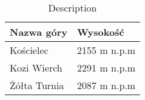 \begin{table}[htbp]
    \centering
    \begin{tabular}{ | m{2.5cm} | m{2.5cm} | }
        \hline
        \textbf{Nazwa góry} & \textbf{Wysokość} \\
        \hline
        Kościelec & 2155 m n.p.m \\
        \hline
        Kozi Wierch & 2291 m n.p.m \\
        \hline
        Żółta Turnia & 2087 m n.p.m \\
        \hline
    \end{tabular}
    \caption{Description}
    \label{tab:table1_kz}
\end{table}

